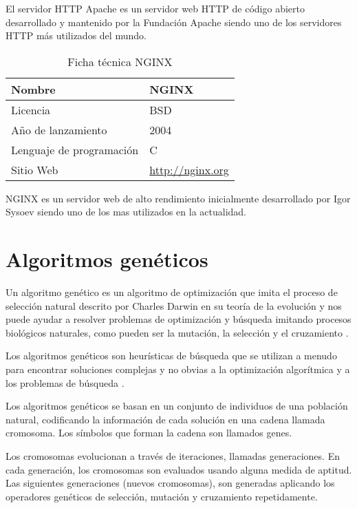 El servidor HTTP Apache es un servidor web HTTP de código abierto desarrollado y mantenido por la Fundación Apache siendo uno de los servidores HTTP más utilizados del mundo.​


\begin{table}[H]
\begin{tabular}{|l|l|}
\hline
Nombre                   & NGINX                       \\ \hline
Licencia                 & BSD                        \\ \hline
Año de lanzamiento       & 2004                        \\ \hline
Lenguaje de programación & C                            \\ \hline
Sitio Web                & \url{http://nginx.org} \\ \hline
\end{tabular}
\caption{Ficha técnica NGINX}
\end{table}

NGINX es un servidor web de alto rendimiento inicialmente desarrollado por Igor Sysoev siendo uno de los mas utilizados en la actualidad.

\section {Algoritmos genéticos}

Un algoritmo genético es un algoritmo de optimización que imita el proceso de selección natural descrito por Charles Darwin en su teoría de la evolución y nos puede ayudar a resolver problemas de optimización y búsqueda imitando procesos biológicos naturales, como pueden ser la mutación, la selección y el cruzamiento \cite{batista_algoritmos_2009}.

\bigskip
Los algoritmos genéticos son heurísticas de búsqueda que se utilizan a menudo para encontrar soluciones complejas y no obvias a la optimización algorítmica y a los problemas de búsqueda \cite{orcero_inteligencia_2002}.

\bigskip
Los algoritmos genéticos se basan en un conjunto de individuos de una población natural, codificando la información de cada solución en una cadena llamada cromosoma. Los símbolos que forman la cadena son llamados genes.

\bigskip
Los cromosomas evolucionan a través de iteraciones, llamadas generaciones. En cada generación, los cromosomas son evaluados usando alguna medida de aptitud. Las siguientes generaciones (nuevos cromosomas), son generadas aplicando los operadores genéticos de selección, mutación y cruzamiento repetidamente.


